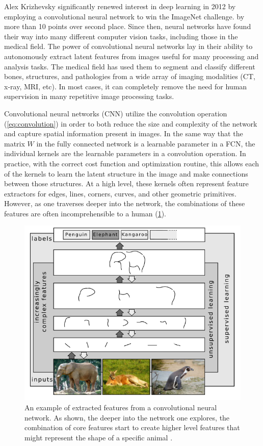 Alex Krizhevsky significantly renewed interest in deep learning in 2012 by employing a convolutional neural network to win the ImageNet challenge. \cite{russakovskyImageNetLargeScale2015} by more than 10 points over second place.
Since then, neural networks have found their way into many different computer vision tasks, including those in the medical field.
The power of convolutional neural networks lay in their ability to autonomously extract latent features from images useful for many processing and analysis tasks.
The medical field has used them to segment and classify different bones, structures, and pathologies from a wide array of imaging modalities (CT, x-ray, MRI, etc).
In most cases, it can completely remove the need for human supervision in many repetitive image processing tasks.

Convolutional neural networks (CNN) utilize the convolution operation (\cref{eq:convolution}) in order to both reduce the size and complexity of the network and capture spatial information present in images.
In the same way that the matrix $W$ in the fully connected network is a learnable parameter in a FCN, the individual kernels are the learnable parameters in a convolution operation.
In practice, with the correct cost function and optimization routine, this allows each of the kernels to learn the latent structure in the image and make connections between those structures.
At a high level, these kernels often represent feature extractors for edges, lines, corners, curves, and other geometric primitives.
However, as one traverses deeper into the network, the combinations of these features are often incomprehensible to a human (\cref{fig:conv-layers}).

\begin{figure}[h!]
    \centering
    \includegraphics[width=0.7\linewidth]{figs/background/png/conv-layers.png}
    \caption[An example of extracted features from a convolutional neural network]{An example of extracted features from a convolutional neural network. As shown, the deeper into the network one explores, the combination of core features start to create higher level features that might represent the shape of a specific animal \cite{schulzDeepLearningLayerWise2012}.}
    \label{fig:conv-layers}
\end{figure}

